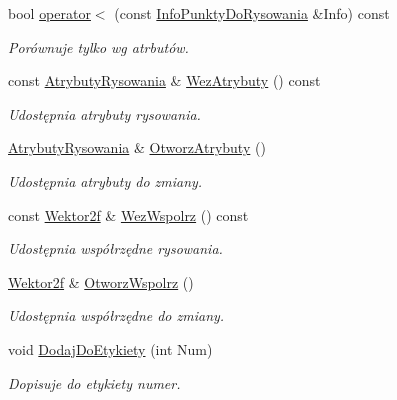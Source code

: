 \begin{DoxyCompactItemize}
bool \mbox{\hyperlink{class_pz_g_1_1_info_punkty_do_rysowania_acc9f21bca0c987c540783d3bedcbd33a}{operator$<$}} (const \mbox{\hyperlink{class_pz_g_1_1_info_punkty_do_rysowania}{Info\+Punkty\+Do\+Rysowania}} \&Info) const
\begin{DoxyCompactList}\small\item\em Porównuje tylko wg atrbutów. \end{DoxyCompactList}\item 
const \mbox{\hyperlink{class_pz_g_1_1_atrybuty_rysowania}{Atrybuty\+Rysowania}} \& \mbox{\hyperlink{class_pz_g_1_1_info_punkty_do_rysowania_a7639b8891f0f7975451b4d675ff7cb31}{Wez\+Atrybuty}} () const
\begin{DoxyCompactList}\small\item\em Udostępnia atrybuty rysowania. \end{DoxyCompactList}\item 
\mbox{\hyperlink{class_pz_g_1_1_atrybuty_rysowania}{Atrybuty\+Rysowania}} \& \mbox{\hyperlink{class_pz_g_1_1_info_punkty_do_rysowania_a93c59d4f6fa5687ceef68db7c832c10a}{Otworz\+Atrybuty}} ()
\begin{DoxyCompactList}\small\item\em Udostępnia atrybuty do zmiany. \end{DoxyCompactList}\item 
const \mbox{\hyperlink{class_pz_g_1_1_wektor2f}{Wektor2f}} \& \mbox{\hyperlink{class_pz_g_1_1_info_punkty_do_rysowania_ae84e4bfa68f132661ff90dac48d83e8c}{Wez\+Wspolrz}} () const
\begin{DoxyCompactList}\small\item\em Udostępnia współrzędne rysowania. \end{DoxyCompactList}\item 
\mbox{\hyperlink{class_pz_g_1_1_wektor2f}{Wektor2f}} \& \mbox{\hyperlink{class_pz_g_1_1_info_punkty_do_rysowania_a9a367a5b7977f3d16f2466a4d5f89a8a}{Otworz\+Wspolrz}} ()
\begin{DoxyCompactList}\small\item\em Udostępnia współrzędne do zmiany. \end{DoxyCompactList}\item 
void \mbox{\hyperlink{class_pz_g_1_1_info_punkty_do_rysowania_a94340d4c219b5469f79cd70cb1638aa3}{Dodaj\+Do\+Etykiety}} (int Num)
\begin{DoxyCompactList}\small\item\em Dopisuje do etykiety numer. \end{DoxyCompactList}\item 

\end{DoxyCompactItemize}
